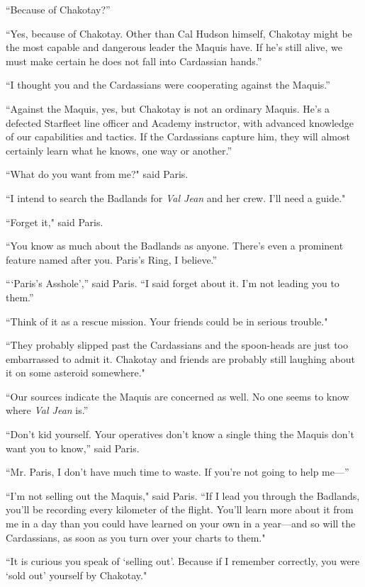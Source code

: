 \documentclass[twoside,letterpaper,12pt]{memoir}
\begin{document}
``Because of Chakotay?''

``Yes, because of Chakotay. Other than Cal Hudson himself, Chakotay might be the most capable and dangerous leader the Maquis have. If he's still alive, we must make certain he does not fall into Cardassian hands.''

``I thought you and the Cardassians were cooperating against the Maquis.''

``Against the Maquis, yes, but Chakotay is not an ordinary Maquis. He's a defected Starfleet line officer and Academy instructor, with advanced knowledge of our capabilities and tactics. If the Cardassians capture him, they will almost certainly learn what he knows, one way or another.''

``What do you want from me?" said Paris.

``I intend to search the Badlands for \textit{Val Jean} and her crew. I'll need a guide."

``Forget it," said Paris.

``You know as much about the Badlands as anyone. There's even a prominent feature named after you. Paris's Ring, I believe.''

```Paris's Asshole','' said Paris. ``I said forget about it. I'm not leading you to them.''

``Think of it as a rescue mission. Your friends could be in serious trouble."

``They probably slipped past the Cardassians and the spoon-heads are just too embarrassed to admit it. Chakotay and friends are probably still laughing about it on some asteroid somewhere."

``Our sources indicate the Maquis are concerned as well. No one seems to know where \textit{Val Jean} is.''

``Don't kid yourself. Your operatives don't know a single thing the Maquis don't want you to know,'' said Paris.

``Mr. Paris, I don't have much time to waste. If you're not going to help me---''

``I'm not selling out the Maquis," said Paris. ``If I lead you through the Badlands, you'll be recording every kilometer of the flight. You'll learn more about it from me in a day than you could have learned on your own in a year---and so will the Cardassians, as soon as you turn over your charts to them."

``It is curious you speak of `selling out'. Because if I remember correctly, you were `sold out' yourself by Chakotay."
\end{document}
